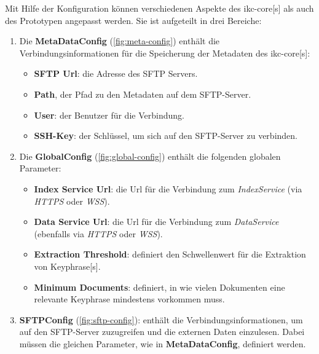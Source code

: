 Mit Hilfe der Konfiguration können verschiedenen Aspekte des \gls{ikc-core}[s] als auch des Prototypen angepasst werden. Sie ist aufgeteilt in drei Bereiche:
\begin{enumerate}
    \item Die \textbf{MetaDataConfig} (\autoref{fig:meta-config}) enthält die Verbindungsinformationen für die Speicherung der Metadaten des \gls{ikc-core}[s]:
    \begin{itemize}
        \item \textbf{SFTP Url}: die Adresse des \gls{SFTP} Servers.
        \item \textbf{Path}, der Pfad zu den Metadaten auf dem \gls{SFTP}-Server.
        \item \textbf{User}: der Benutzer für die Verbindung.
        \item \textbf{SSH-Key}: der Schlüssel, um sich auf den \gls{SFTP}-Server zu verbinden. 
    \end{itemize}
    \item Die \textbf{GlobalConfig} (\autoref{fig:global-config}) enthält die folgenden globalen Parameter:
    \begin{itemize}
        \item \textbf{Index Service Url}: die Url für die Verbindung zum \textit{IndexService} (via \textit{HTTPS} oder \textit{WSS}).
        \item \textbf{Data Service Url}: die Url für die Verbindung zum \textit{DataService} (ebenfalls via \textit{HTTPS} oder \textit{WSS}).
        \item \textbf{Extraction Threshold}: definiert den Schwellenwert für die Extraktion von \gls{Keyphrase}[s].
        \item \textbf{Minimum Documents}: definiert, in wie vielen Dokumenten eine relevante \gls{Keyphrase} mindestens vorkommen muss.
    \end{itemize}
    \item \textbf{SFTPConfig} (\autoref{fig:sftp-config}): enthält die Verbindungsinformationen, um auf den \gls{SFTP}-Server zuzugreifen und die externen Daten einzulesen. Dabei müssen die gleichen Parameter, wie in \textbf{MetaDataConfig}, definiert werden.
\end{enumerate}


